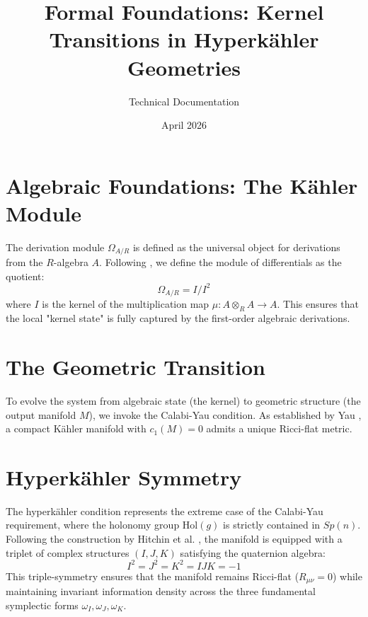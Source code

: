 \documentclass[11pt,oneside]{article}
\title{Formal Foundations: Kernel Transitions in Hyperk\"ahler Geometries}
\author{Technical Documentation}
\date{April 2026}
\begin{document}
\maketitle

\section{Algebraic Foundations: The K\"ahler Module}
The derivation module $\Omega_{A/R}$ is defined as the universal object for derivations from the $R$-algebra $A$. Following \cite{grothendieck1967}, we define the module of differentials as the quotient:
\begin{equation}
    \Omega_{A/R} = I / I^2
\end{equation}
where $I$ is the kernel of the multiplication map $\mu: A \otimes_R A \to A$. This ensures that the local "kernel state" is fully captured by the first-order algebraic derivations.

\section{The Geometric Transition}
To evolve the system from algebraic state (the kernel) to geometric structure (the output manifold $M$), we invoke the Calabi-Yau condition. As established by Yau \cite{yau1978}, a compact K\"ahler manifold with $c_1(M) = 0$ admits a unique Ricci-flat metric. 



\section{Hyperk\"ahler Symmetry}
The hyperk\"ahler condition represents the extreme case of the Calabi-Yau requirement, where the holonomy group $\text{Hol}(g)$ is strictly contained in $Sp(n)$. Following the construction by Hitchin et al. \cite{hitchin1987}, the manifold is equipped with a triplet of complex structures $(I, J, K)$ satisfying the quaternion algebra:
\begin{equation}
    I^2 = J^2 = K^2 = IJK = -1
\end{equation}
This triple-symmetry ensures that the manifold remains Ricci-flat ($R_{\mu\nu} = 0$) while maintaining invariant information density across the three fundamental symplectic forms $\omega_I, \omega_J, \omega_K$.
\end{document}
